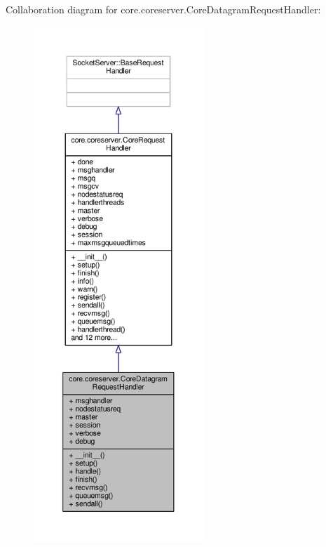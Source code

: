 Collaboration diagram for core.\+coreserver.\+Core\+Datagram\+Request\+Handler\+:
\nopagebreak
\begin{figure}[H]
\begin{center}
\leavevmode
\includegraphics[height=550pt]{classcore_1_1coreserver_1_1_core_datagram_request_handler__coll__graph}
\end{center}
\end{figure}
